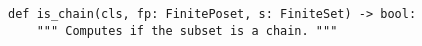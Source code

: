 \begin{verbatim}
def is_chain(cls, fp: FinitePoset, s: FiniteSet) -> bool:
    """ Computes if the subset is a chain. """
\end{verbatim}